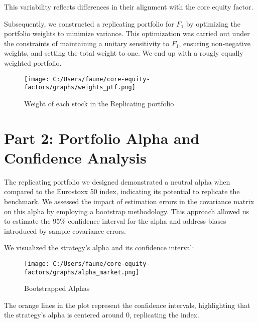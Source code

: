 \documentclass[
  a4paper]{article}
\begin{document}
This variability reflects differences in their alignment with the core
equity factor.

Subsequently, we constructed a replicating portfolio for \(F_1\) by
optimizing the portfolio weights to minimize variance. This optimization
was carried out under the constraints of maintaining a unitary
sensitivity to \(F_1\), ensuring non-negative weights, and setting the
total weight to one. We end up with a rougly equally weighted portfolio.

\begin{figure}

{\centering \texttt{[image: C:/Users/faune/core-equity-factors/graphs/weights\_ptf.png]}

}

\caption{Weight of each stock in the Replicating portfolio}

\end{figure}

\newpage

\hypertarget{part-2-portfolio-alpha-and-confidence-analysis}{%
\section{Part 2: Portfolio Alpha and Confidence
Analysis}\label{part-2-portfolio-alpha-and-confidence-analysis}}

The replicating portfolio we designed demonstrated a neutral alpha when
compared to the Eurostoxx 50 index, indicating its potential to
replicate the benchmark. We assessed the impact of estimation errors in
the covariance matrix on this alpha by employing a bootstrap
methodology. This approach allowed us to estimate the 95\% confidence
interval for the alpha and address biases introduced by sample
covariance errors.

We visualized the strategy's alpha and its confidence interval:

\begin{figure}

{\centering \texttt{[image: C:/Users/faune/core-equity-factors/graphs/alpha\_market.png]}

}

\caption{Bootstrapped Alphas}

\end{figure}

The orange lines in the plot represent the confidence intervals,
highlighting that the strategy's alpha is centered around 0, replicating
the index.
\end{document}
